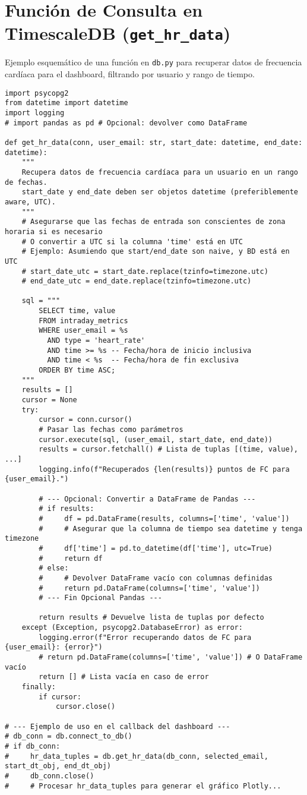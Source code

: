 \section{Función de Consulta en TimescaleDB (\texttt{get\_hr\_data})}
\label{annex:code:get_hr}
Ejemplo esquemático de una función en \texttt{db.py} para recuperar datos de frecuencia cardíaca para el dashboard, filtrando por usuario y rango de tiempo.
\begin{lstlisting}[caption={Ejemplo de función de consulta de FC (\texttt{db.py}).}, label={lst:get_hr_code}]
import psycopg2
from datetime import datetime
import logging
# import pandas as pd # Opcional: devolver como DataFrame

def get_hr_data(conn, user_email: str, start_date: datetime, end_date: datetime):
    """
    Recupera datos de frecuencia cardíaca para un usuario en un rango de fechas.
    start_date y end_date deben ser objetos datetime (preferiblemente aware, UTC).
    """
    # Asegurarse que las fechas de entrada son conscientes de zona horaria si es necesario
    # O convertir a UTC si la columna 'time' está en UTC
    # Ejemplo: Asumiendo que start/end_date son naive, y BD está en UTC
    # start_date_utc = start_date.replace(tzinfo=timezone.utc)
    # end_date_utc = end_date.replace(tzinfo=timezone.utc)

    sql = """
        SELECT time, value
        FROM intraday_metrics
        WHERE user_email = %s
          AND type = 'heart_rate'
          AND time >= %s -- Fecha/hora de inicio inclusiva
          AND time < %s  -- Fecha/hora de fin exclusiva
        ORDER BY time ASC;
    """
    results = []
    cursor = None
    try:
        cursor = conn.cursor()
        # Pasar las fechas como parámetros
        cursor.execute(sql, (user_email, start_date, end_date))
        results = cursor.fetchall() # Lista de tuplas [(time, value), ...]
        logging.info(f"Recuperados {len(results)} puntos de FC para {user_email}.")

        # --- Opcional: Convertir a DataFrame de Pandas ---
        # if results:
        #     df = pd.DataFrame(results, columns=['time', 'value'])
        #     # Asegurar que la columna de tiempo sea datetime y tenga timezone
        #     df['time'] = pd.to_datetime(df['time'], utc=True)
        #     return df
        # else:
        #     # Devolver DataFrame vacío con columnas definidas
        #     return pd.DataFrame(columns=['time', 'value'])
        # --- Fin Opcional Pandas ---

        return results # Devuelve lista de tuplas por defecto
    except (Exception, psycopg2.DatabaseError) as error:
        logging.error(f"Error recuperando datos de FC para {user_email}: {error}")
        # return pd.DataFrame(columns=['time', 'value']) # O DataFrame vacío
        return [] # Lista vacía en caso de error
    finally:
        if cursor:
            cursor.close()

# --- Ejemplo de uso en el callback del dashboard ---
# db_conn = db.connect_to_db()
# if db_conn:
#     hr_data_tuples = db.get_hr_data(db_conn, selected_email, start_dt_obj, end_dt_obj)
#     db_conn.close()
#     # Procesar hr_data_tuples para generar el gráfico Plotly...
\end{lstlisting}
